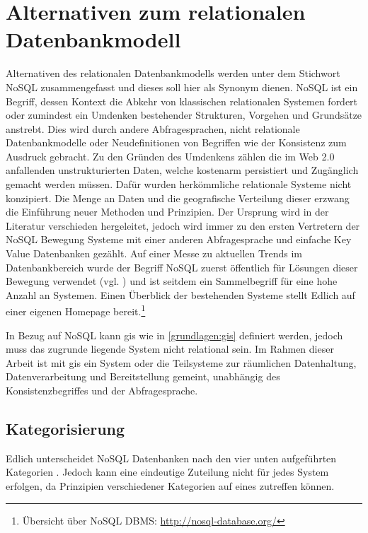 \section{Alternativen zum relationalen Datenbankmodell}
\label{nosql}
Alternativen des relationalen Datenbankmodells werden unter dem Stichwort NoSQL zusammengefasst und dieses soll hier als Synonym dienen.
NoSQL ist ein Begriff, dessen Kontext die Abkehr von klassischen relationalen Systemen fordert oder zumindest ein Umdenken bestehender Strukturen, Vorgehen und Grundsätze anstrebt.
Dies wird durch andere Abfragesprachen, nicht relationale Datenbankmodelle oder Neudefinitionen von Begriffen wie der Konsistenz zum Ausdruck gebracht.
Zu den Gründen des Umdenkens zählen die im Web 2.0 anfallenden unstrukturierten Daten, welche kostenarm persistiert und Zugänglich gemacht werden müssen.
Dafür wurden herkömmliche relationale Systeme nicht konzipiert.
Die Menge an Daten und die geografische Verteilung dieser erzwang die Einführung neuer Methoden und Prinzipien.
Der Ursprung wird in der Literatur verschieden hergeleitet, jedoch wird immer zu den ersten Vertretern der NoSQL Bewegung Systeme mit einer anderen Abfragesprache und einfache Key Value Datenbanken gezählt.
Auf einer Messe zu aktuellen Trends im Datenbankbereich wurde der Begriff NoSQL zuerst öffentlich für Lösungen dieser Bewegung verwendet (vgl. \cite{website:originnosql}) und ist seitdem ein Sammelbegriff für eine hohe Anzahl an Systemen.
Einen Überblick der bestehenden Systeme stellt Edlich auf einer eigenen Homepage bereit.\footnote{Übersicht über NoSQL DBMS: \url{http://nosql-database.org/}}

In Bezug auf NoSQL kann \Gls{gis} wie in \ref{grundlagen:gis} definiert werden, jedoch muss das zugrunde liegende System nicht relational sein.
Im Rahmen dieser Arbeit ist mit \Gls{gis} ein System oder die Teilsysteme zur räumlichen Datenhaltung, Datenverarbeitung und Bereitstellung gemeint, unabhängig des Konsistenzbegriffes und der Abfragesprache.

\subsection{Kategorisierung}
Edlich unterscheidet NoSQL Datenbanken nach den vier unten aufgeführten Kategorien \cite{book:nosql-einfuehrung}.
Jedoch kann eine eindeutige Zuteilung nicht für jedes System erfolgen, da Prinzipien verschiedener Kategorien auf eines zutreffen können.


